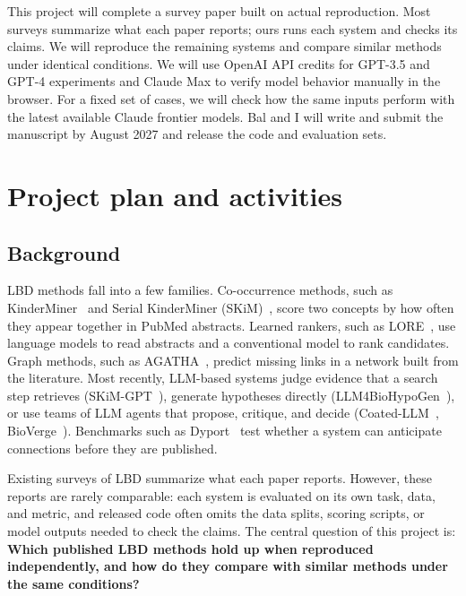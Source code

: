 \documentclass[11pt]{article}
\begin{document}
This project will complete a survey paper built on actual reproduction. Most surveys summarize what each paper reports; ours runs each system and checks its claims. We will reproduce the remaining systems and compare similar methods under identical conditions. We will use OpenAI API credits for GPT-3.5 and GPT-4 experiments and Claude Max to verify model behavior manually in the browser. For a fixed set of cases, we will check how the same inputs perform with the latest available Claude frontier models. Bal and I will write and submit the manuscript by August 2027 and release the code and evaluation sets.

\section*{Project plan and activities}

\subsection*{Background}

LBD methods fall into a few families. Co-occurrence methods, such as KinderMiner~\cite{kuusisto2017} and Serial KinderMiner (SKiM)~\cite{millikin2023}, score two concepts by how often they appear together in PubMed abstracts. Learned rankers, such as LORE~\cite{li2025}, use language models to read abstracts and a conventional model to rank candidates. Graph methods, such as AGATHA~\cite{sybrandt2020}, predict missing links in a network built from the literature. Most recently, LLM-based systems judge evidence that a search step retrieves (SKiM-GPT~\cite{freeman2026}), generate hypotheses directly (LLM4BioHypoGen~\cite{qi2024}), or use teams of LLM agents that propose, critique, and decide (Coated-LLM~\cite{xu2025}, BioVerge~\cite{yang2025}). Benchmarks such as Dyport~\cite{tyagin2024} test whether a system can anticipate connections before they are published.

Existing surveys of LBD summarize what each paper reports. However, these reports are rarely comparable: each system is evaluated on its own task, data, and metric, and released code often omits the data splits, scoring scripts, or model outputs needed to check the claims. The central question of this project is: \textbf{Which published LBD methods hold up when reproduced independently, and how do they compare with similar methods under the same conditions?}
\end{document}

